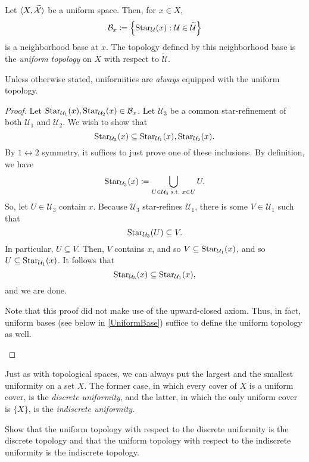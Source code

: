 \begin{prp}\label{UniformTopology}
Let $\langle X,\widetilde{\mathcal{X}}\rangle$ be a uniform space.  Then, for $x\in X$,
\begin{equation}
\mathcal{B}_x\coloneqq \left\{ \operatorname{Star} _{\mathcal{U}}(x):\mathcal{U}\in \widetilde{\mathcal{U}}\right\}
\end{equation}
is a neighborhood base at $x$.  The topology defined by this neighborhood base is the \emph{uniform topology} on $X$ with respect to $\widetilde{\mathcal{U}}$.
\begin{rmk}
Unless otherwise stated, uniformities are \emph{always} equipped with the uniform topology.
\end{rmk}
\begin{proof}
Let $\operatorname{Star} _{\mathcal{U}_1}(x),\operatorname{Star} _{\mathcal{U}_2}(x)\in \mathcal{B}_x$.  Let $\mathcal{U}_3$ be a common star-refinement of both $\mathcal{U}_1$ and $\mathcal{U}_2$.  We wish to show that
\begin{equation}
\operatorname{Star} _{\mathcal{U}_3}(x)\subseteq \operatorname{Star} _{\mathcal{U}_1}(x),\operatorname{Star} _{\mathcal{U}_2}(x).
\end{equation}
By $1\leftrightarrow 2$ symmetry, it suffices to just prove one of these inclusions.  By definition, we have
\begin{equation}
\operatorname{Star} _{\mathcal{U}_3}(x)\coloneqq \bigcup _{U\in \mathcal{U}_3\text{ s.t.~} x\in U}U.
\end{equation}
So, let $U\in \mathcal{U}_3$ contain $x$.  Because $\mathcal{U}_3$ star-refines $\mathcal{U}_1$, there is some $V\in \mathcal{U}_1$ such that
\begin{equation}
\operatorname{Star} _{\mathcal{U}_3}(U)\subseteq V.
\end{equation}
In particular, $U\subseteq V$.  Then, $V$ contains $x$, and so $V\subseteq \operatorname{Star} _{\mathcal{U}_1}(x)$, and so $U\subseteq \operatorname{Star} _{\mathcal{U}_1}(x)$.  It follows that
\begin{equation}
\operatorname{Star} _{\mathcal{U}_3}(x)\subseteq \operatorname{Star} _{\mathcal{U}_1}(x),
\end{equation}
and we are done.
\begin{rmk}
Note that this proof did not make use of the upward-closed axiom.  Thus, in fact, uniform bases (see below in \cref{UniformBase}) suffice to define the uniform topology as well.
\end{rmk}
\end{proof}
\end{prp}
\begin{exm}
Just as with topological spaces, we can always put the largest and the smallest uniformity on a set $X$.  The former case, in which every cover of $X$ is a uniform cover, is the \emph{discrete uniformity}, and the latter, in which the only uniform cover is $\{ X\}$, is the \emph{indiscrete uniformity}.
\begin{exr}
Show that the uniform topology with respect to the discrete uniformity is the discrete topology and that the uniform topology with respect to the indiscrete uniformity is the indiscrete topology.
\end{exr}
\end{exm}

